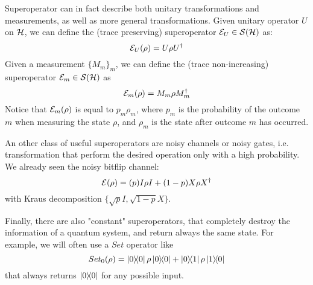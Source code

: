 Superoperator can in fact describe both unitary transformations and measurements, as well as more general transformations. Given unitary operator $U$ on $\mathcal{H}$, we can define  the (trace preserving) superoperator $\mathcal{E}_U \in \mathcal{S}(\mathcal{H})$ as:
\[ \mathcal{E}_U(\rho) = U \rho U^\dagger\]
Given a measurement $\{M_m\}_m$, we can define the (trace non-increasing) superoperator $\mathcal{E}_m \in \mathcal{S}(\mathcal{H})$ as 
\[\mathcal{E}_m(\rho) = M_m\rho M_m^\dagger\]
Notice that $\mathcal{E}_m(\rho)$ is equal to $p_m\rho_m$, where $p_m$ is the probability of the outcome $m$ when measuring the state $\rho$, and $\rho_m$ is the state after outcome $m$ has occurred. 


An other class of useful superoperators are noisy channels or noisy gates, i.e. transformation that perform the desired operation only with a high probability. We already seen the noisy bitflip channel: 
\[\mathcal{E}(\rho) = (p) 
I\rho I
+
(1-p)
X \rho X^\dagger
\]
with Kraus decomposition $\{\sqrt{p}I, \sqrt{1-p}X\}$.


Finally, there are also "constant" superoperators, that completely destroy the information of a quantum system, and return always the same state. For example, we will often use a $ Set$ operator like
\[Set_0(\rho) = \proj{0}\rho\proj{0} + \ketbra{0}{1}\rho\ketbra{1}{0}\]
that always returns $\ket{0}\!\!\bra{0}$ for any possible input.